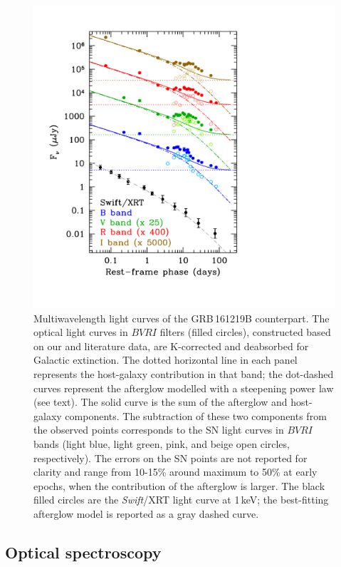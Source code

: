 \documentclass[fleqn,usenatbib]{mnras}
\begin{document}
\begin{figure}
\centering
\includegraphics[scale=0.7]{plots/figure1_revised.pdf}
\caption{Multiwavelength light curves of the GRB\,161219B counterpart.  The optical light curves in $BVRI$ filters (filled circles), constructed based on our and literature data, are K-corrected and deabsorbed for Galactic extinction.   The dotted horizontal line in each panel represents the host-galaxy contribution in that band; the dot-dashed curves represent the afterglow modelled with a steepening power law (see text).  The solid curve is the sum of the afterglow and host-galaxy components.   The subtraction of these two components from the observed points corresponds to the SN light curves in  $BVRI$ bands (light blue, light green, pink, and beige open circles, respectively).   The errors on the SN points are not reported for clarity and range from 10-15\% around maximum to 50\% at early epochs, when the contribution of the afterglow is larger.  The black filled circles  are  the {\it Swift}/XRT light curve  at 1\,keV;  the best-fitting afterglow model is reported as a gray dashed curve.}
\label{fig:decompLC} 
\end{figure}


\subsection{Optical spectroscopy}
\end{document}
